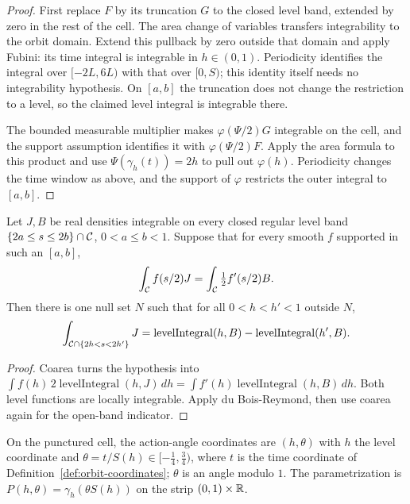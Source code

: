 \begin{proof}
\leanok
First replace $F$ by its truncation $G$ to the closed level band,
extended by zero in the rest of the cell. The area change of variables
transfers integrability to the orbit domain. Extend this pullback by zero
outside that domain and apply Fubini: its time integral is integrable in
$h\in(0,1)$. Periodicity identifies the integral over $[-2L,6L)$ with
that over $[0,S)$; this identity itself needs no integrability hypothesis.
On $[a,b]$ the truncation does not change the restriction to a level,
so the claimed level integral is integrable there.

The bounded measurable multiplier makes $\varphi(\Psi/2)G$ integrable
on the cell, and the support assumption identifies it with
$\varphi(\Psi/2)F$. Apply the area formula to this product and use
$\Psi(\gamma_h(t))=2h$ to pull out $\varphi(h)$. Periodicity changes
the time window as above, and the support of $\varphi$ restricts the
outer integral to $[a,b]$.
\end{proof}

\begin{lemma}
\label{lem:annular-from-cutoff}
\leanok
Let $J,B$ be real densities integrable on every closed regular level band
$\{2a\le s\le2b\}\cap\mathcal{C}$, $0<a\le b<1$. Suppose that for every smooth
$f$ supported in such an $[a,b]$,
\[
 \int_{\mathcal{C}} f(s/2)J=\int_{\mathcal{C}} \tfrac12f'(s/2)B.
\]
Then there is one null set $N$ such that for all $0<h<h'<1$ outside $N$,
\[
 \int_{\mathcal{C}\cap\{2h<s<2h'\}}J
   =\operatorname{levelIntegral}(h,B)-\operatorname{levelIntegral}(h',B).
\]
\end{lemma}

\begin{proof}
\leanok
Coarea turns the hypothesis into
$\int f(h)\,2\operatorname{levelIntegral}(h,J)\,dh
 =\int f'(h)\operatorname{levelIntegral}(h,B)\,dh$.
Both level functions are locally integrable.
Apply du Bois-Reymond, then use coarea again for the open-band indicator.
\end{proof}

\begin{definition}
\label{def:action-angle}
\leanok
On the punctured cell, the action-angle coordinates are $(h,\theta)$ with $h$ the level
coordinate and $\theta=t/S(h)\in[-\frac14,\frac34)$, where $t$ is the time coordinate of
Definition~\ref{def:orbit-coordinates}; $\theta$ is an angle modulo $1$. The
parametrization is $P(h,\theta)=\gamma_h(\theta S(h))$ on the strip $(0,1)\times\mathbb{R}$.
\end{definition}

